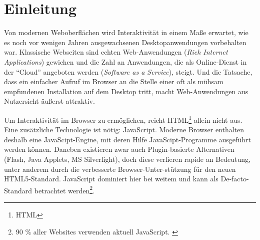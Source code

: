 \documentclass[a4paper, 12pt, hidelinks, listof=totoc, listoftables=totoc, bibliography=totoc]{scrreprt}
\begin{document}


\pagestyle{empty} %


%
%
%
%
%
%
%
%
%
%


\pagestyle{scrheadings} %




\tableofcontents

\newpage



\chapter{Einleitung}

Von modernen Weboberflächen wird Interaktivität in einem Maße erwartet, wie es noch vor wenigen Jahren ausgewachsenen Desktopanwendungen vorbehalten war. Klassische Webseiten sind echten Web-Anwendungen (\emph{Rich Internet Applications}) gewichen und die Zahl an Anwendungen, die als Online-Dienst in der "`Cloud"' angeboten werden (\emph{Software as a Service}), steigt. Und die Tatsache, dass ein einfacher Aufruf im Browser an die Stelle einer oft als mühsam empfundenen Installation auf dem Desktop tritt, macht Web-Anwendungen aus Nutzersicht äußerst attraktiv.


Um Interaktivität im Browser zu ermöglichen, reicht HTML\footnote{\ac{HTML}} allein nicht aus. Eine zusätzliche Technologie ist nötig: JavaScript. Moderne Browser enthalten deshalb eine JavaScipt-Engine, mit deren Hilfe JavaScipt-Programme ausgeführt werden können. Daneben existieren zwar auch Plugin-basierte Alternativen (Flash, Java Applets, MS Silverlight), doch diese verlieren rapide an Bedeutung, unter anderem durch die verbesserte Browser-Unter-stützung für den neuen HTML5-Standard. JavaScript dominiert hier bei weitem und kann als De-facto-Standard betrachtet werden\footnote{90 \% aller Websites verwenden aktuell JavaScript. \cite{w3techs.CLI}}.
\end{document}
